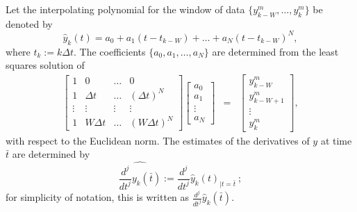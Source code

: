 Let the interpolating polynomial for the window of 
data $ \{ y_{k-W}^m, \ldots, y_k^m \}$
be denoted by
\begin{equation}
\hat{y}_k(t) = a_0 + a_1 (t - t_{k-W}) + \ldots + a_N (t - t_{k-W})^N,
\label{interppoly}
\end{equation}
where $t_k := k \Delta t$.
The coefficients $\{ a_0, a_1, \ldots, a_N \}$ are determined from the least
squares solution of 
\begin{eqnarray}
\left[ \begin{array}{cccc} 1 & 0 & \ldots & 0 \\
1 & \Delta t & \ldots & (\Delta t)^N \\
\vdots & \vdots & \vdots & \vdots \\
1 & W \Delta t & \ldots & (W \Delta t)^N 
\end{array} \right] \left[ \begin{array}{l} a_0 \\ a_1 \\ \vdots \\ a_N
\end{array} \right] & = & \left[ \begin{array}{l} y^m_{k-W} \\
y^m_{k-W+1} \\ \vdots \\ y^m_k
\end{array} \right],
\label{leastsquares}
\end{eqnarray}
with respect to the Euclidean norm.  
The estimates of the derivatives of $y$ at time $\bar{t}$ are determined by
\begin{equation}
\widehat{ \frac{d^j}{dt^j}y_k(\bar{t}) } := \frac{d^j}{dt^j} \hat{y}_k(t)_{|t=\bar{t}} \  ;
\label{derivestimates}
\end{equation}
for simplicity of notation, this is written as 
$\frac{d^j}{dt^j} \hat{y}_k( \bar{t} )$.


